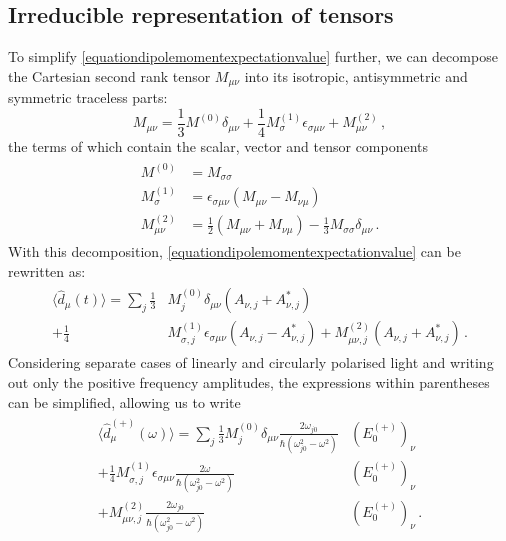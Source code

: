 \documentclass[../Thesis-IJspeert.tex]{subfiles}
\begin{document}
\subsection{Irreducible representation of tensors}
To simplify \autoref{equationdipolemomentexpectationvalue} further, we can decompose the Cartesian second rank tensor $M_{\mu\nu}$ into its isotropic, antisymmetric and symmetric traceless parts:
\begin{equation}
\label{irreduciblerepcartesian}
	M_{\mu\nu}=\frac{1}{3}M^{(0)}\delta_{\mu\nu} + \frac{1}{4}M_{\sigma}^{(1)}\epsilon_{\sigma\mu\nu} + M_{\mu\nu}^{(2)} \,,
\end{equation}
the terms of which contain the scalar, vector and tensor components
\begin{align}
\begin{split}
 M^{(0)} &= M_{\sigma\sigma} \\
 M^{(1)}_\sigma &= \epsilon_{\sigma\mu\nu}(M_{\mu\nu}-M_{\nu\mu}) \\
 M^{(2)}_{\mu\nu} &= \frac{1}{2}(M_{\mu\nu}+M_{\nu\mu}) - \frac{1}{3}M_{\sigma\sigma}\delta_{\mu\nu} \,.
\end{split}
\end{align}
With this decomposition, \autoref{equationdipolemomentexpectationvalue} can be rewritten as:
\begin{align}
\begin{split}
\langle \hat{d}_\mu (t) \rangle = \sum_j \frac{1}{3}&M^{(0)}_j \delta_{\mu\nu} \left(A_{\nu,j}+A_{\nu,j}^*\right) \\+ \frac{1}{4} &M^{(1)}_{\sigma,j} \epsilon_{\sigma\mu\nu} \left( A_{\nu,j} - A_{\nu,j}^* \right) + M^{(2)}_{\mu\nu,j} \left( A_{\nu,j}+A_{\nu,j}^*\right) \,.
\end{split}
\end{align}
Considering separate cases of linearly and circularly polarised light and writing out only the positive frequency amplitudes, the expressions within parentheses can be simplified, allowing us to write
\begin{align}
\label{dipolemomentintermsofirreduciblerep}
\begin{split}
\langle \hat{d}^{(+)}_\mu (\omega) \rangle = \sum_j \frac{1}{3} M^{(0)}_j \delta_{\mu\nu} \frac{2\omega_{j0} }{\hbar (\omega_{j0}^2-\omega^2)} &( E_0^{(+)} )_\nu \\+ \frac{1}{4} M^{(1)}_{\sigma,j} \epsilon_{\sigma\mu\nu} \frac{2\omega }{\hbar (\omega_{j0}^2-\omega^2)} &( E_0^{(+)} )_\nu \\+ M^{(2)}_{\mu\nu,j} \frac{2\omega_{j0} }{\hbar (\omega_{j0}^2-\omega^2)} &( E_0^{(+)} )_\nu \,.
\end{split}
\end{align}
\end{document}
